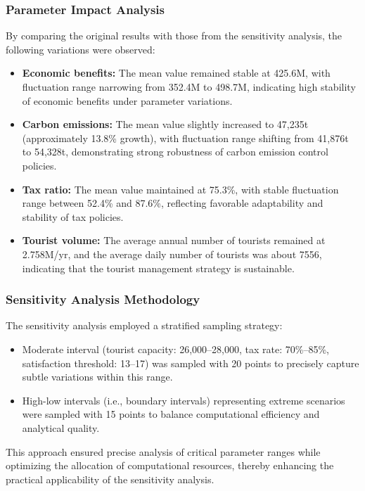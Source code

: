 \documentclass{mcmthesis}
\begin{document}
\subsubsection{Parameter Impact Analysis}
By comparing the original results with those from the sensitivity analysis, the following variations were observed:
\begin{itemize}
  \item \textbf{Economic benefits:} The mean value remained stable at 425.6M, with fluctuation range narrowing from 352.4M to 498.7M, indicating high stability of economic benefits under parameter variations.
  \item \textbf{Carbon emissions:} The mean value slightly increased to 47,235t (approximately 13.8\% growth), with fluctuation range shifting from 41,876t to 54,328t, demonstrating strong robustness of carbon emission control policies.
  \item \textbf{Tax ratio:} The mean value maintained at 75.3\%, with stable fluctuation range between 52.4\% and 87.6\%, reflecting favorable adaptability and stability of tax policies.
  \item \textbf{Tourist volume:} The average annual number of tourists remained at 2.758M/yr, and the average daily number of tourists was about 7556, indicating that the tourist management strategy is sustainable.
\end{itemize}
\subsubsection{Sensitivity Analysis Methodology}
The sensitivity analysis employed a stratified sampling strategy:
\begin{itemize}
  \item Moderate interval (tourist capacity: 26,000–28,000, tax rate: 70\%–85\%, satisfaction threshold: 13–17) was sampled with 20 points to precisely capture subtle variations within this range.
  \item High-low intervals (i.e., boundary intervals) representing extreme scenarios were sampled with 15 points to balance computational efficiency and analytical quality.
\end{itemize}
This approach ensured precise analysis of critical parameter ranges while optimizing the allocation of computational resources, thereby enhancing the practical applicability of the sensitivity analysis.
\end{document}
